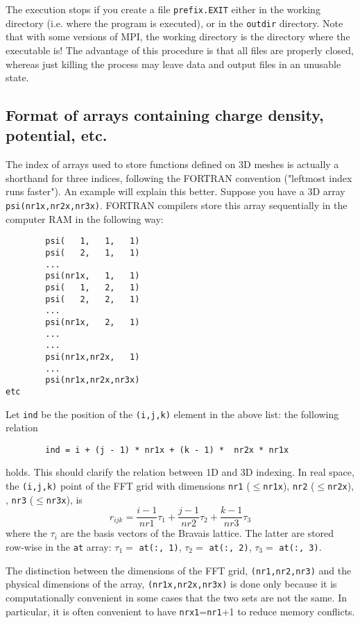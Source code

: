 \documentclass[12pt,a4paper]{article}
\begin{document}
The execution stops if you create a file \texttt{prefix.EXIT} either 
in the working directory (i.e. where the program is executed), or in 
the  \texttt{outdir} directory. Note that with some versions of MPI, 
the working directory  is the directory where the executable is! 
The advantage of this procedure is that all files are properly closed, 
whereas  just killing the process may leave data and output files in 
an unusable state.

\subsection{Format of arrays containing charge density, potential, etc.}

The index of arrays used to store functions defined on 3D meshes is
actually a shorthand for three indices, following the FORTRAN convention 
("leftmost index runs faster"). An example will explain this better. 
Suppose you have a 3D array \texttt{psi(nr1x,nr2x,nr3x)}. FORTRAN 
compilers store this array sequentially  in the computer RAM in the following way:
\begin{verbatim}
        psi(   1,   1,   1)
        psi(   2,   1,   1)
        ...
        psi(nr1x,   1,   1)
        psi(   1,   2,   1)
        psi(   2,   2,   1)
        ...
        psi(nr1x,   2,   1)
        ...
        ...
        psi(nr1x,nr2x,   1)
        ...
        psi(nr1x,nr2x,nr3x)
etc
\end{verbatim}
Let \texttt{ind} be the position of the \texttt{(i,j,k)} element in the above list: 
the following relation
\begin{verbatim}
        ind = i + (j - 1) * nr1x + (k - 1) *  nr2x * nr1x
\end{verbatim}
holds. This should clarify the relation between 1D and 3D indexing. In real
space, the \texttt{(i,j,k)} point of the FFT grid with dimensions 
\texttt{nr1} ($\le$\texttt{nr1x}), 
\texttt{nr2}  ($\le$\texttt{nr2x}), , \texttt{nr3} ($\le$\texttt{nr3x}), is
$$
r_{ijk}=\frac{i-1}{nr1} \tau_1  +  \frac{j-1}{nr2} \tau_2 +
\frac{k-1}{nr3} \tau_3 
$$
where the $\tau_i$ are the basis vectors of the Bravais lattice. 
The latter are stored row-wise in the \texttt{at} array:
$\tau_1 = $ \texttt{at(:, 1)}, 
$\tau_2 = $ \texttt{at(:, 2)}, 
$\tau_3 = $ \texttt{at(:, 3)}.

The distinction between the dimensions of the FFT grid,
\texttt{(nr1,nr2,nr3)} and the physical dimensions of the array,
\texttt{(nr1x,nr2x,nr3x)} is done only because it is computationally
convenient in some cases that the two sets are not the same.
In particular, it is often convenient to have \texttt{nrx1}=\texttt{nr1}+1
to reduce memory conflicts.
\end{document}
